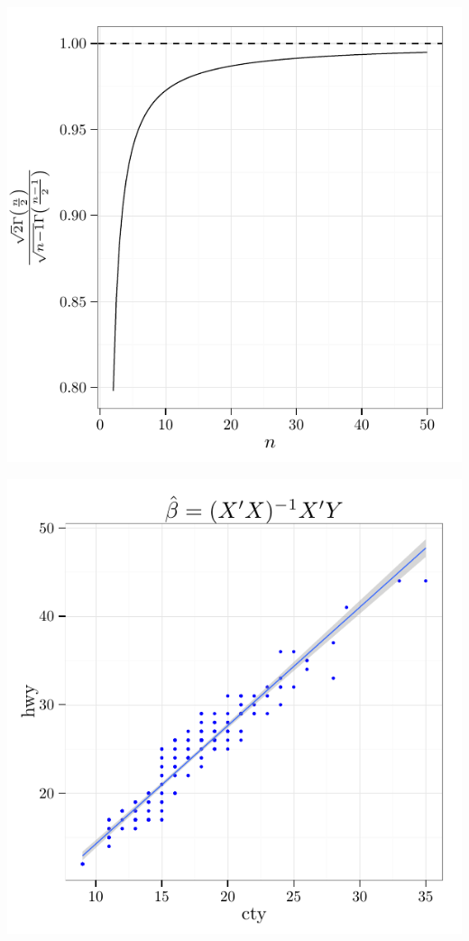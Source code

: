 \documentclass{article}\usepackage[]{graphicx}\usepackage[]{color}
\makeatletter
\def\maxwidth{ %
  \ifdim\Gin@nat@width>\linewidth
    \linewidth
  \else
    \Gin@nat@width
  \fi
}
\newenvironment{knitrout}{}{} %
\theoremstyle{rcode}
\makeatother
\begin{document}
\begin{knitrout}
\color{fgcolor}

{\centering \includegraphics[width=1.0\textwidth]{figure/molatexFIG} 

}



\end{knitrout}


\begin{knitrout}
\color{fgcolor}

{\centering \includegraphics[width=\maxwidth]{figure/base} 

}



\end{knitrout}
\end{document}
